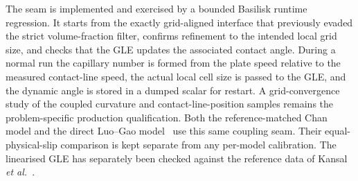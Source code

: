 \documentclass[11pt,a4paper]{article}
\begin{document}
The seam is implemented and exercised by a bounded Basilisk runtime regression.
It starts from the exactly grid-aligned interface that previously evaded the
strict volume-fraction filter, confirms refinement to the intended local grid
size, and checks that the GLE updates the associated contact angle. During a
normal run the capillary number is formed from the plate speed relative to the
measured contact-line speed, the actual local cell size is passed to the GLE,
and the dynamic angle is stored in a dumped scalar for restart. A
grid-convergence study of the coupled curvature and contact-line-position
samples remains the problem-specific production qualification.
Both the reference-matched Chan model and the direct Luo--Gao
model~\cite{luo2025} use this same coupling seam. Their equal-physical-slip
comparison is kept separate from any per-model calibration. The linearised
GLE has separately been checked against the reference data of Kansal \emph{et
al.}~\cite{kansal2024}.
\end{document}
